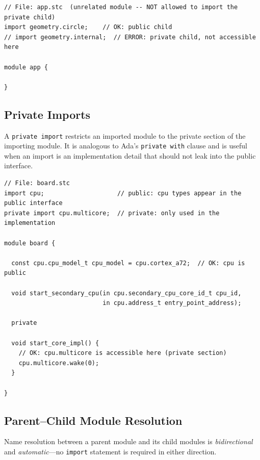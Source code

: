 \documentclass[11pt,letterpaper,twoside,openany]{book}
\begin{document}
\begin{lstlisting}
// File: app.stc  (unrelated module -- NOT allowed to import the private child)
import geometry.circle;    // OK: public child
// import geometry.internal;  // ERROR: private child, not accessible here

module app {

}
\end{lstlisting}

\subsection{Private Imports}

A \verb'private import' restricts an imported module to the private section of the importing
module.  It is analogous to Ada's \verb'private with' clause and is useful when an import
is an implementation detail that should not leak into the public interface.

\begin{lstlisting}
// File: board.stc
import cpu;                    // public: cpu types appear in the public interface
private import cpu.multicore;  // private: only used in the implementation

module board {

  const cpu.cpu_model_t cpu_model = cpu.cortex_a72;  // OK: cpu is public

  void start_secondary_cpu(in cpu.secondary_cpu_core_id_t cpu_id,
                           in cpu.address_t entry_point_address);

  private

  void start_core_impl() {
    // OK: cpu.multicore is accessible here (private section)
    cpu.multicore.wake(0);
  }

}
\end{lstlisting}

\subsection{Parent--Child Module Resolution}

Name resolution between a parent module and its child modules is \emph{bidirectional}
and \emph{automatic}---no \verb'import' statement is required in either direction.
\end{document}
